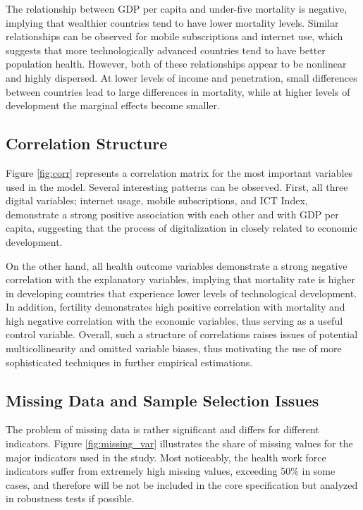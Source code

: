\documentclass[12pt]{article}
\begin{document}
\medskip
The relationship between GDP per capita and under-five mortality is negative, implying that wealthier countries tend to have lower mortality levels. Similar relationships can be observed for mobile subscriptions and internet use, which suggests that more technologically advanced countries tend to have better population health. However, both of these relationships appear to be nonlinear and highly dispersed. At lower levels of income and penetration, small differences between countries lead to large differences in mortality, while at higher levels of development the marginal effects become smaller.



\subsection{Correlation Structure}

Figure \ref{fig:corr} represents a correlation matrix for the most important variables used in the model. Several interesting patterns can be observed. First, all three digital variables; internet usage, mobile subscriptions, and ICT Index, demonstrate a strong positive association with each other and with GDP per capita, suggesting that the process of digitalization in closely related to economic development.

\medskip
On the other hand, all health outcome variables demonstrate a strong negative correlation with the explanatory variables, implying that mortality rate is higher in developing countries that experience lower levels of technological development. In addition, fertility demonstrates high positive correlation with mortality and high negative correlation with the economic variables, thus serving as a useful control variable. Overall, such a structure of correlations raises issues of potential multicollinearity and omitted variable biases, thus motivating the use of more sophisticated techniques in further empirical estimations.

\subsection{Missing Data and Sample Selection Issues}

The problem of missing data is rather significant and differs for different indicators. Figure \ref{fig:missing_var} illustrates the share of missing values for the major indicators used in the study. Most noticeably, the health work force indicators suffer from extremely high missing values, exceeding 50\% in some cases, and therefore will be not be included in the core specification but analyzed in robustness tests if possible.
\end{document}
